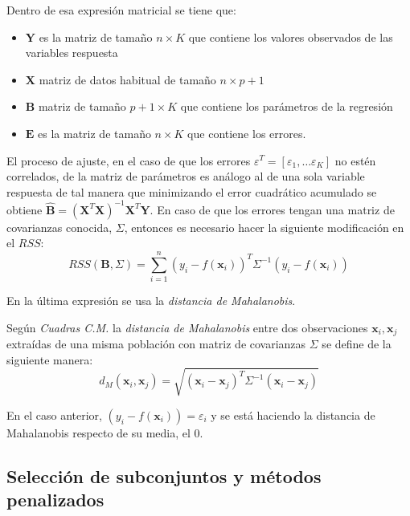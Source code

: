 \noindent Dentro de esa expresión matricial se tiene que: 
\begin{itemize}
\item $\textbf{Y}$ es la matriz de tamaño $n\times K$ que contiene los valores observados de las variables respuesta
\item $\textbf{X}$ matriz de datos habitual de tamaño $n \times p+1$ 
\item $\textbf{B}$ matriz de tamaño $ p+1 \times K$ que contiene los parámetros de la regresión 
\item $\textbf{E}$ es la matriz de tamaño $ n \times K$ que contiene los errores. 
\end{itemize}

\noindent El proceso de ajuste, en el caso de que los errores $\varepsilon^T=[\varepsilon_1,\ldots \varepsilon_K]$ no estén correlados, de la matriz de parámetros es análogo al de una sola variable respuesta de tal manera que minimizando el error cuadrático acumulado se obtiene $\hat{\textbf{B}}=(\textbf{X}^T\textbf{X})^{-1}\textbf{X}^T\textbf{Y}$. En caso de que los errores tengan una matriz de covarianzas conocida, $\Sigma$, entonces es necesario hacer la siguiente modificación en el $RSS$:
\begin{equation}
RSS(\textbf{B},\Sigma)=\sum_{i=1}^n(y_i-f(\textbf{x}_i))^T \Sigma^{-1} (y_i-f(\textbf{x}_i))
\end{equation}

\noindent En la última expresión se usa la \textit{distancia de Mahalanobis}.
\begin{defi}
Según \textit{Cuadras C.M.}\cite{Cuadras 2014} la \textit{distancia de Mahalanobis} entre dos observaciones $\textbf{x}_i, \textbf{x}_j$ extraídas de una misma población con matriz de covarianzas $\Sigma$ se define de la siguiente manera: 
\begin{equation}
d_M(\textbf{x}_i, \textbf{x}_j)=\sqrt{(\textbf{x}_i- \textbf{x}_j)^T \Sigma^{-1}(\textbf{x}_i-\textbf{x}_j)}
\end{equation}
\end{defi}

\noindent En el caso anterior, $(y_i-f(\textbf{x}_i))=\varepsilon_i$ y se está haciendo la distancia de Mahalanobis respecto de su media, el 0. 


\subsection{Selección de subconjuntos y métodos penalizados}

